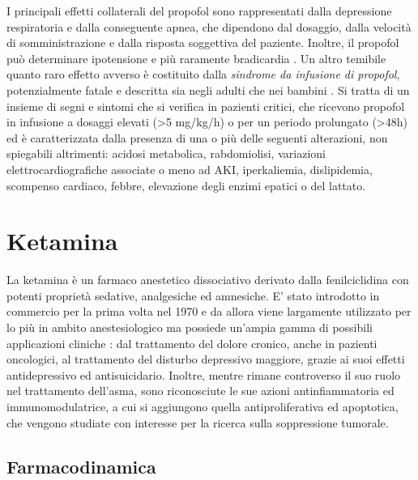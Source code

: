 I principali effetti collaterali del propofol sono rappresentati dalla depressione respiratoria e dalla conseguente apnea, che dipendono dal dosaggio, dalla velocità di somministrazione e dalla risposta soggettiva del paziente. Inoltre, il propofol può determinare ipotensione e più raramente bradicardia \cite{propofolsafety2010}.
Un altro temibile quanto raro effetto avverso è costituito dalla \emph{sindrome da infusione di propofol}, potenzialmente fatale e descritta sia negli adulti che nei bambini \cite{Propofolinfusionsyndrome2019}. Si tratta di un insieme di segni e sintomi che si verifica in pazienti critici, che ricevono propofol in infusione a dosaggi elevati (>5 mg/kg/h) o per un periodo prolungato (>48h) ed è caratterizzata dalla presenza di una o più delle seguenti alterazioni, non spiegabili altrimenti: acidosi metabolica, rabdomiolisi, variazioni elettrocardiografiche associate o meno ad AKI, iperkaliemia, dislipidemia, scompenso cardiaco, febbre, elevazione degli enzimi epatici o del lattato. 

\section{Ketamina}

La ketamina è un farmaco anestetico dissociativo derivato dalla fenilciclidina con potenti proprietà sedative, analgesiche ed amnesiche. E' stato introdotto in commercio per la prima volta nel 1970 e da allora viene largamente utilizzato per lo più in ambito anestesiologico ma possiede un'ampia gamma di possibili applicazioni cliniche \cite{Ketamineapplication2019}: dal trattamento del dolore cronico, anche in pazienti oncologici, al trattamento del disturbo depressivo maggiore, grazie ai suoi effetti antidepressivo ed antisuicidario. Inoltre, mentre rimane controverso il suo ruolo nel trattamento dell'asma, sono riconosciute le sue azioni antinfiammatoria ed immunomodulatrice, a cui si aggiungono quella antiproliferativa ed apoptotica, che vengono studiate con interesse per la ricerca sulla soppressione tumorale.

\subsection*{Farmacodinamica}

